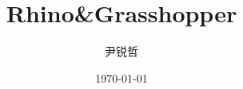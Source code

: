 \documentclass[aspectratio=169]{beamer}
\title{Rhino\&Grasshopper}
\author{尹锐哲}
\date{\today}
\institute[NBU]{宁波大学}
\begin{document}
    
\begin{frame}
    \maketitle

    

\end{frame}
\end{document}
